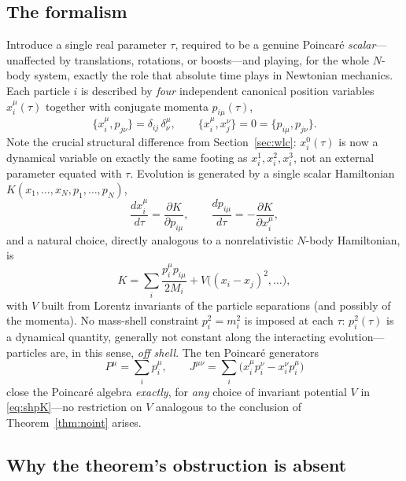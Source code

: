 \documentclass[11pt]{article}
\newcommand{\pb}[2]{\{#1,#2\}}
\begin{document}
\subsection{The formalism}

Introduce a single real parameter $\tau$, required to be a genuine Poincar\'e \emph{scalar}---unaffected by translations, rotations, or boosts---and playing, for the whole $N$-body system, exactly the role that absolute time plays in Newtonian mechanics. Each particle $i$ is described by \emph{four} independent canonical position variables $x_i^\mu(\tau)$ together with conjugate momenta $p_{i\mu}(\tau)$,
\begin{equation}
\pb{x_i^\mu}{p_{j\nu}} = \delta_{ij}\,\delta^\mu_\nu, \qquad \pb{x_i^\mu}{x_j^\nu}=0=\pb{p_{i\mu}}{p_{j\nu}}.
\end{equation}
Note the crucial structural difference from Section~\ref{sec:wlc}: $x_i^0(\tau)$ is now a dynamical variable on exactly the same footing as $x_i^1,x_i^2,x_i^3$, not an external parameter equated with $\tau$. Evolution is generated by a single scalar Hamiltonian $K(x_1,\dots,x_N,p_1,\dots,p_N)$,
\begin{equation}
\frac{dx_i^\mu}{d\tau} = \frac{\partial K}{\partial p_{i\mu}}, \qquad \frac{dp_{i\mu}}{d\tau} = -\frac{\partial K}{\partial x_i^\mu},
\end{equation}
and a natural choice, directly analogous to a nonrelativistic $N$-body Hamiltonian, is
\begin{equation}
K = \sum_i \frac{p_i^\mu p_{i\mu}}{2M_i} + V\big((x_i-x_j)^2,\dots\big),
\label{eq:shpK}
\end{equation}
with $V$ built from Lorentz invariants of the particle separations (and possibly of the momenta). No mass-shell constraint $p_i^2=m_i^2$ is imposed at each $\tau$: $p_i^2(\tau)$ is a dynamical quantity, generally not constant along the interacting evolution---particles are, in this sense, \emph{off shell}. The ten Poincar\'e generators
\begin{equation}
P^\mu=\sum_i p_i^\mu, \qquad J^{\mu\nu}=\sum_i\big(x_i^\mu p_i^\nu - x_i^\nu p_i^\mu\big)
\end{equation}
close the Poincar\'e algebra \emph{exactly}, for \emph{any} choice of invariant potential $V$ in \eqref{eq:shpK}---no restriction on $V$ analogous to the conclusion of Theorem~\ref{thm:noint} arises.

\subsection{Why the theorem's obstruction is absent}
\end{document}
